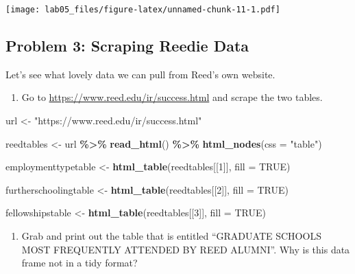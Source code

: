 \documentclass[
]{article}
\newenvironment{Shaded}{\begin{snugshade}}{\end{snugshade}}
\newcommand{\AttributeTok}[1]{\textcolor[rgb]{0.13,0.29,0.53}{#1}}
\newcommand{\ConstantTok}[1]{\textcolor[rgb]{0.56,0.35,0.01}{#1}}
\newcommand{\DecValTok}[1]{\textcolor[rgb]{0.00,0.00,0.81}{#1}}
\newcommand{\FunctionTok}[1]{\textcolor[rgb]{0.13,0.29,0.53}{\textbf{#1}}}
\newcommand{\NormalTok}[1]{#1}
\newcommand{\OtherTok}[1]{\textcolor[rgb]{0.56,0.35,0.01}{#1}}
\newcommand{\SpecialCharTok}[1]{\textcolor[rgb]{0.81,0.36,0.00}{\textbf{#1}}}
\newcommand{\StringTok}[1]{\textcolor[rgb]{0.31,0.60,0.02}{#1}}
\providecommand{\tightlist}{%
  \setlength{\itemsep}{0pt}\setlength{\parskip}{0pt}}
\begin{document}
\texttt{[image: lab05\_files/figure-latex/unnamed-chunk-11-1.pdf]}

\hypertarget{problem-3-scraping-reedie-data}{%
\subsection{Problem 3: Scraping Reedie
Data}\label{problem-3-scraping-reedie-data}}

Let's see what lovely data we can pull from Reed's own website.

\begin{enumerate}
\def\labelenumi{\alph{enumi}.}
\tightlist
\item
  Go to \url{https://www.reed.edu/ir/success.html} and scrape the two
  tables.
\end{enumerate}

\begin{Shaded}
\begin{Highlighting}[]
\NormalTok{url }\OtherTok{\textless{}{-}} \StringTok{"https://www.reed.edu/ir/success.html"}

\NormalTok{reedtables }\OtherTok{\textless{}{-}}\NormalTok{ url }\SpecialCharTok{\%\textgreater{}\%}
  \FunctionTok{read\_html}\NormalTok{() }\SpecialCharTok{\%\textgreater{}\%}
  \FunctionTok{html\_nodes}\NormalTok{(}\AttributeTok{css =} \StringTok{"table"}\NormalTok{)}

\NormalTok{employmenttypetable }\OtherTok{\textless{}{-}} \FunctionTok{html\_table}\NormalTok{(reedtables[[}\DecValTok{1}\NormalTok{]], }\AttributeTok{fill =} \ConstantTok{TRUE}\NormalTok{)}


\NormalTok{furtherschoolingtable }\OtherTok{\textless{}{-}} \FunctionTok{html\_table}\NormalTok{(reedtables[[}\DecValTok{2}\NormalTok{]], }\AttributeTok{fill =} \ConstantTok{TRUE}\NormalTok{)}


\NormalTok{fellowshipstable }\OtherTok{\textless{}{-}} \FunctionTok{html\_table}\NormalTok{(reedtables[[}\DecValTok{3}\NormalTok{]], }\AttributeTok{fill =} \ConstantTok{TRUE}\NormalTok{)}
\end{Highlighting}
\end{Shaded}

\begin{enumerate}
\def\labelenumi{\alph{enumi}.}
\setcounter{enumi}{1}
\tightlist
\item
  Grab and print out the table that is entitled ``GRADUATE SCHOOLS MOST
  FREQUENTLY ATTENDED BY REED ALUMNI''. Why is this data frame not in a
  tidy format?
\end{enumerate}
\end{document}
